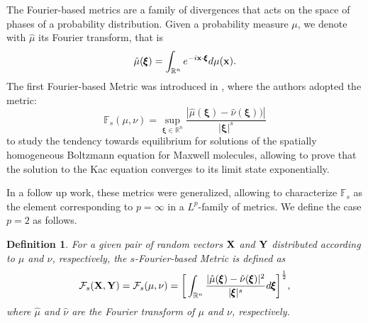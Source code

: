 \documentclass{article}
\def\bx{{\bf x}}
\def\bX{{\bf X}}
\def\bY{{\bf Y}}
\def\bxi{{\pmb\xi}}
\def \erre{\mathbb{R}}
\newtheorem{definition}{Definition}
\begin{document}
% 
The Fourier-based metrics are a family of divergences that acts on the space of phases of a probability distribution.
% 
Given a probability measure $\mu$, we denote with $\hat\mu$ its Fourier transform, that is
\begin{equation}
    \label{eq:muFtransform}
    \hat\mu(\bxi)=\int_{\erre^n}e^{-i\bx\cdot\bxi}d\mu(\bx).
\end{equation}
% 
The first Fourier-based Metric was introduced in \cite{GTW}, where the authors adopted the metric:
\[
\mathbb{F}_s(\mu,\nu)=\sup_{\bxi\in\erre^n}\frac{|\hat\mu(\bxi)-\hat\nu(\bxi))|}{|\bxi|^s}
\]
to study the tendency towards equilibrium for solutions of the spatially homogeneous Boltzmann equation for Maxwell molecules, allowing to prove that the solution to the Kac equation converges to its limit state exponentially.
% 
% 
 
% 
In a follow up work, these metrics were generalized, allowing to characterize $\mathbb{F}_s$ as the element corresponding to $p = \infty$ in a $L^p$-family of metrics.
% 
We define the case $p=2$ as follows.
% 


\begin{definition}
    For a given pair of random vectors $\bX$ and $\bY$ distributed according to $\mu$ and $\nu$, respectively, the $s$-Fourier-based Metric is defined as
    \begin{equation}
        \label{me-inf}
        \mathcal{F}_s(\bX,\bY) = \mathcal{F}_s(\mu,\nu) = \bigg[\int_{\erre^n} \frac{|\hat\mu(\bxi) - {\hat \nu}(\bxi)|^2}{|\bxi|^{s}}d\bxi\bigg]^{\frac{1}{2}},
    \end{equation}
    where $\hat\mu$ and $\hat\nu$ are the Fourier transform of $\mu$ and $\nu$, respectively.
\end{definition}
\end{document}
